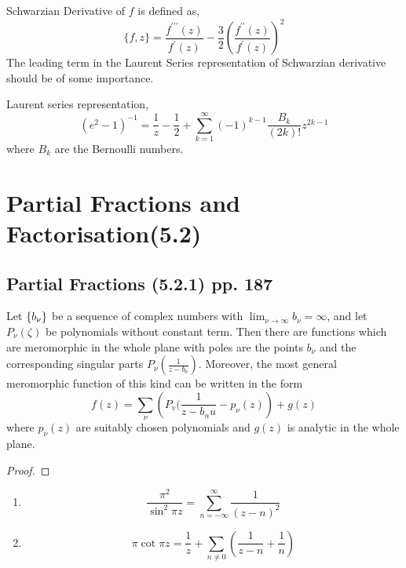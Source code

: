 \begin{definition}
	Schwarzian Derivative of $f$ is defined as,
	\[ \{f,z\} = \frac{f^{\prime\prime\prime}(z)}{f^\prime(z)} - \frac{3}{2} \left(\frac{f^{\prime\prime}(z)}{f^\prime(z)}\right)^2 \]
	The leading term in the Laurent Series representation of Schwarzian derivative should be of some importance.
\end{definition}

\begin{remark}
	Laurent series representation,
	\[ (e^2-1)^{-1} = \frac{1}{z} - \frac{1}{2} + \sum_{k=1}^\infty (-1)^{k-1}\frac{B_k}{(2k)!} z^{2k-1} \]
	where $B_k$ are the Bernoulli numbers.
\end{remark}
\section{Partial Fractions and Factorisation(5.2)}
\subsection{Partial Fractions (5.2.1) pp. 187}
\begin{theorem}
	Let $\left\{b_\nu\right\}$ be a sequence of complex numbers with $\displaystyle \lim_{\nu \to \infty} b_\nu = \infty$, and let $P_\nu(\zeta)$ be polynomials without constant term. Then there are functions which are meromorphic in the whole plane with poles are the points $b_\nu$ and the corresponding singular parts $P_\nu(\frac{1}{z-b_\nu})$. Moreover, the most general meromorphic function of this kind can be written in the form
	\begin{equation}
		f(z) = \sum_\nu \left( P_v(\frac{1}{z-b_nu} - p_\nu(z) \right) + g(z)
	\end{equation}
	where $p_\nu(z)$ are suitably chosen polynomials and $g(z)$ is analytic in the whole plane.
\end{theorem}
\begin{proof}
\end{proof}

\begin{remark}
	\begin{enumerate}
		\item \[ \frac{\pi^2}{\sin^2 \pi z} = \sum_{n=-\infty}^\infty \frac{1}{(z-n)^2} \]
		\item \[ \pi \cot \pi z = \frac{1}{z} + \sum_{n \ne 0} \left(\frac{1}{z-n} + \frac{1}{n} \right) \]
	\end{enumerate}
\end{remark}

